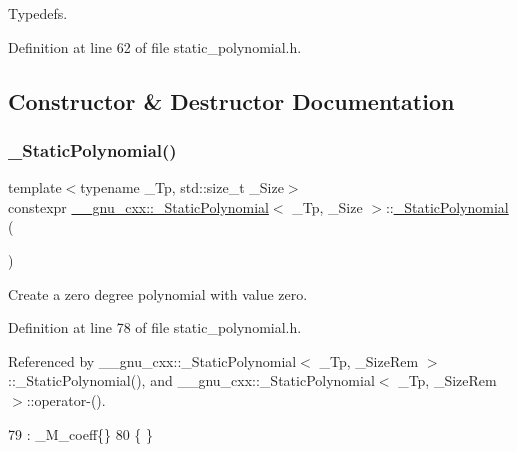 Typedefs. 

Definition at line 62 of file static\+\_\+polynomial.\+h.



\subsection{Constructor \& Destructor Documentation}
\mbox{\label{class____gnu__cxx_1_1__StaticPolynomial_ab4cec2d98bc20429a2f464ec42a39b71}} 
\subsubsection{\texorpdfstring{\+\_\+\+Static\+Polynomial()}{\_StaticPolynomial()}\hspace{0.1cm}{\footnotesize\ttfamily [1/8]}}
{\footnotesize\ttfamily template$<$typename \+\_\+\+Tp, std\+::size\+\_\+t \+\_\+\+Size$>$ \\
constexpr \hyperlink{class____gnu__cxx_1_1__StaticPolynomial}{\+\_\+\+\_\+gnu\+\_\+cxx\+::\+\_\+\+Static\+Polynomial}$<$ \+\_\+\+Tp, \+\_\+\+Size $>$\+::\hyperlink{class____gnu__cxx_1_1__StaticPolynomial}{\+\_\+\+Static\+Polynomial} (\begin{DoxyParamCaption}{ }\end{DoxyParamCaption})\hspace{0.3cm}{\ttfamily [inline]}}

Create a zero degree polynomial with value zero. 

Definition at line 78 of file static\+\_\+polynomial.\+h.



Referenced by \+\_\+\+\_\+gnu\+\_\+cxx\+::\+\_\+\+Static\+Polynomial$<$ \+\_\+\+Tp, \+\_\+\+Size\+Rem $>$\+::\+\_\+\+Static\+Polynomial(), and \+\_\+\+\_\+gnu\+\_\+cxx\+::\+\_\+\+Static\+Polynomial$<$ \+\_\+\+Tp, \+\_\+\+Size\+Rem $>$\+::operator-\/().


\begin{DoxyCode}
79       : \_M\_coeff\{\}
80       \{ \}
\end{DoxyCode}
\mbox{\label{class____gnu__cxx_1_1__StaticPolynomial_ab019a084751761a02aa75f34eb8a2a30}} 
